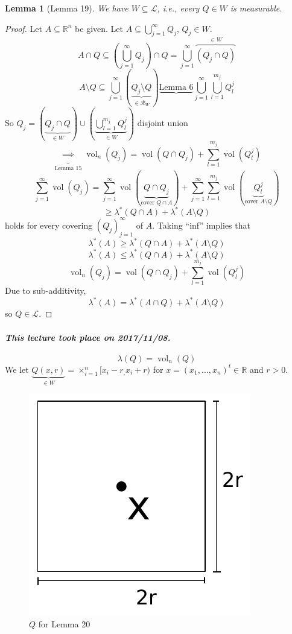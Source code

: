 \documentclass{article}
\newtheorem{lemma}{Lemma}  \numberwithin{lemma}{section}
\newcommand{\dateref}[1]{\paragraph{\textit{This lecture took place on #1.}}}
\DeclareMathOperator{\vol}{vol}  %
\begin{document}
\begin{lemma}[Lemma 19]
  We have $W \subseteq \mathcal L$, i.e., every $Q \in W$ is measurable.
\end{lemma}
\begin{proof}
  Let $A \subseteq \mathbb R^n$ be given.
  Let $A \subseteq \bigcup_{j=1}^\infty Q_j$, $Q_j \in W$.
  \[ A \cap Q \subseteq \left(\bigcup_{j=1}^\infty Q_j\right) \cap Q = \bigcup_{j=1}^\infty \overbrace{(Q_j \cap Q)}^{\in W} \]
  \[ A \setminus Q \subseteq \bigcup_{j=1}^\infty (\underbrace{Q_j \setminus Q}_{\in \mathcal R_W}) \underbrace{\text{Lemma 6}} \bigcup_{j=1}^\infty \bigcup_{l=1}^{m_j} Q_l^j \]
  So $Q_j = (\underbrace{Q_j \cap Q}_{\in W}) \cup (\underbrace{\bigcup_{l=1}^{m_j} Q_l^j}_{\in W})$ disjoint union
  \[ \underbrace{\implies}_{\text{Lemma 15}} \vol_n(Q_j) = \vol(Q \cap Q_j) + \sum_{l=1}^{m_j} \vol(Q_l^j) \]
  \[ \sum_{j=1}^\infty \vol(Q_j) = \sum_{j=1}^\infty \vol(\underbrace{Q \cap Q_j}_{\text{cover } Q \cap A}) + \sum_{j=1}^\infty \sum_{l=1}^{m_j} \vol(\underbrace{Q_l^j}_{\text{cover } A \setminus Q}) \]
  \[ \geq \lambda^*(Q \cap A) + \lambda^*(A \setminus Q) \]
  holds for every covering $(Q_j)_{j=1}^\infty$ of $A$.
  Taking \enquote{inf} implies that
  \[ \lambda^*(A) \geq \lambda^*(Q \cap A) + \lambda^*(A \setminus Q) \]
  \[ \lambda^*(A) \leq \lambda^*(Q \cap A) + \lambda^*(A \setminus Q) \]
  \[ \vol_n(Q_j) = \vol(Q \cap Q_j) + \sum_{l=1}^{m_j} \vol(Q_l^j) \]
  Due to sub-additivity,
  \[ \lambda^*(A) = \lambda^*(A \cap Q) + \lambda^*(A \setminus Q) \]
  so $Q \in \mathcal L$.
\end{proof}

\dateref{2017/11/08}

\[ \lambda(Q) = \vol_n(Q) \]
We let $\underbrace{Q(x, r)}_{\in W} = \times_{i=1}^n [x_i - r_, x_i + r)$ for $x = (x_1, \ldots, x_n)^t \in \mathbb R$ and $r > 0$.

\begin{figure}[!h]
  \begin{center}
    \includegraphics{img/13_q.pdf}
    \caption{$Q$ for Lemma 20}
  \end{center}
\end{figure}
\end{document}
